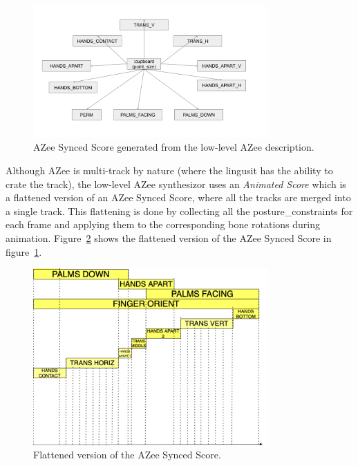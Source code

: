 \documentclass[../../main.tex]{subfiles}
\begin{document}
\begin{figure}[h]
  \centering
  \includegraphics[width=0.8\textwidth]{chapters/multi_track/images/azee_synced_score.png}
  \caption{AZee Synced Score generated from the low-level AZee description.}
  \label{fig:azee_synced_score}
\end{figure}

Although AZee is multi-track by nature (where the lingusit has the ability to crate the track), the low-level AZee synthesizor uses an \emph{Animated Score} which is a flattened version of an AZee Synced Score, where all the tracks are merged into a single track. This flattening is done by collecting all the \gls{posture_constraint}s for each frame and applying them to the corresponding bone rotations during animation. Figure~\ref{fig:azee_flattened_score} shows the flattened version of the AZee Synced Score in figure~{\ref{fig:azee_synced_score}}.

\begin{figure}[h]
  \centering
  \includegraphics[width=0.8\textwidth]{chapters/multi_track/images/azee_flattened_score.png}
  \caption{Flattened version of the AZee Synced Score.}
  \label{fig:azee_flattened_score}
\end{figure}
\end{document}
